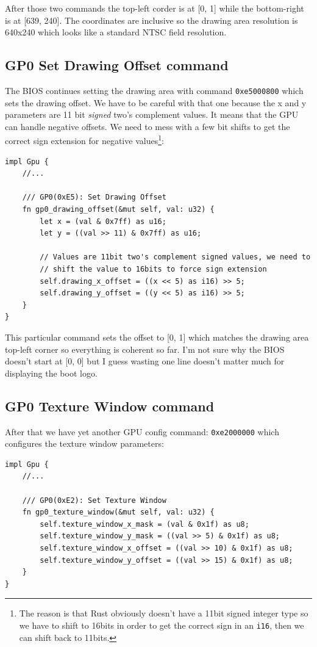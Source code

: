 \documentclass[a4paper]{article}
\newcommand{\code}[1] {\texttt{#1}}
\begin{document}
After those two commands the top-left corder is at [0, 1] while the
bottom-right is at [639, 240]. The coordinates are inclusive so the
drawing area resolution is 640x240 which looks like a standard NTSC
field resolution.

\subsection{GP0 Set Drawing Offset command}

The BIOS continues setting the drawing area with
command \code{0xe5000800} which sets the drawing offset. We have
to be careful with that one because the x and y parameters are 11 bit
\emph{signed} two's complement values. It means that the GPU can
handle negative offsets. We need to mess with a few bit shifts to get
the correct sign extension for negative values\footnote{The reason is
  that Rust obviously doesn't have a 11bit signed integer type so we
  have to shift to 16bits in order to get the correct sign in an
  \code{i16}, then we can shift back to 11bits.}:

\begin{lstlisting}
impl Gpu {
    //...

    /// GP0(0xE5): Set Drawing Offset
    fn gp0_drawing_offset(&mut self, val: u32) {
        let x = (val & 0x7ff) as u16;
        let y = ((val >> 11) & 0x7ff) as u16;

        // Values are 11bit two's complement signed values, we need to
        // shift the value to 16bits to force sign extension
        self.drawing_x_offset = ((x << 5) as i16) >> 5;
        self.drawing_y_offset = ((y << 5) as i16) >> 5;
    }
}
\end{lstlisting}

This particular command sets the offset to [0, 1] which matches the
drawing area top-left corner so everything is coherent so far. I'm not
sure why the BIOS doesn't start at [0, 0] but I guess wasting one line
doesn't matter much for displaying the boot logo.

\subsection{GP0 Texture Window command}

After that we have yet another GPU config command: \code{0xe2000000}
which configures the texture window parameters:

\begin{lstlisting}
impl Gpu {
    //...

    /// GP0(0xE2): Set Texture Window
    fn gp0_texture_window(&mut self, val: u32) {
        self.texture_window_x_mask = (val & 0x1f) as u8;
        self.texture_window_y_mask = ((val >> 5) & 0x1f) as u8;
        self.texture_window_x_offset = ((val >> 10) & 0x1f) as u8;
        self.texture_window_y_offset = ((val >> 15) & 0x1f) as u8;
    }
}
\end{lstlisting}
\end{document}
